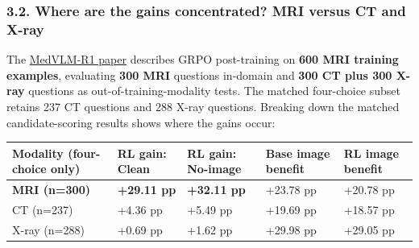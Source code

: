 \documentclass[
  10pt,
  a4paper,
]{article}
\newcounter{none} %
\begin{document}
\subsubsection{3.2. Where are the gains concentrated? MRI versus CT and
X-ray}\label{where-are-the-gains-concentrated-mri-versus-ct-and-x-ray}

The
\href{https://papers.miccai.org/miccai-2025/paper/3267_paper.pdf}{MedVLM-R1
paper} describes GRPO post-training on \textbf{600 MRI training
examples}, evaluating \textbf{300 MRI} questions in-domain and
\textbf{300 CT plus 300 X-ray} questions as out-of-training-modality
tests. The matched four-choice subset retains 237 CT questions and 288
X-ray questions. Breaking down the matched candidate-scoring results
shows where the gains occur:

{\def\LTcaptype{none} %
\begin{longtable}[]{@{}
  >{\raggedright\arraybackslash}p{}
  >{\raggedleft\arraybackslash}p{}
  >{\raggedleft\arraybackslash}p{}
  >{\raggedleft\arraybackslash}p{}
  >{\raggedleft\arraybackslash}p{}@{}}
\toprule\noalign{}
\begin{minipage}[b]{\linewidth}\raggedright
Modality (four-choice only)
\end{minipage} & \begin{minipage}[b]{\linewidth}\raggedleft
RL gain: Clean
\end{minipage} & \begin{minipage}[b]{\linewidth}\raggedleft
RL gain: No-image
\end{minipage} & \begin{minipage}[b]{\linewidth}\raggedleft
Base image benefit
\end{minipage} & \begin{minipage}[b]{\linewidth}\raggedleft
RL image benefit
\end{minipage} \\
\midrule\noalign{}
\endhead
\bottomrule\noalign{}
\endlastfoot
\textbf{MRI (n=300)} & \textbf{+29.11 pp} & \textbf{+32.11 pp} & +23.78
pp & +20.78 pp \\
CT (n=237) & +4.36 pp & +5.49 pp & +19.69 pp & +18.57 pp \\
X-ray (n=288) & +0.69 pp & +1.62 pp & +29.98 pp & +29.05 pp \\
\end{longtable}
}
\end{document}
